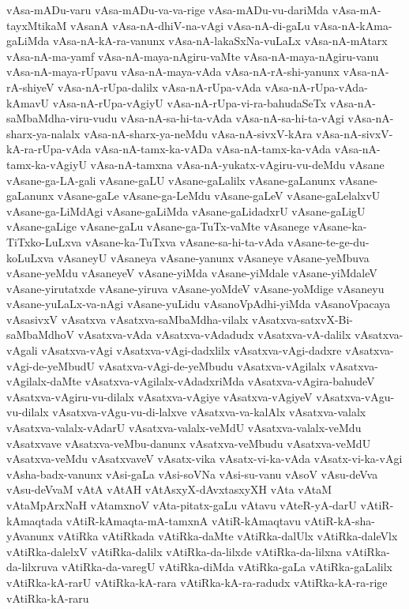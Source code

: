 {vAsa-mADu-varu
vAsa-mADu-va-va-rige
vAsa-mADu-vu-dariMda
vAsa-mA-tayxMtikaM
vAsanA
vAsa-nA-dhiV-na-vAgi
vAsa-nA-di-gaLu
vAsa-nA-kAma-gaLiMda
vAsa-nA-kA-ra-vanunx
vAsa-nA-lakaSxNa-vuLaLx
vAsa-nA-mAtarx
vAsa-nA-ma-yamf
vAsa-nA-maya-nAgiru-vaMte
vAsa-nA-maya-nAgiru-vanu
vAsa-nA-maya-rUpavu
vAsa-nA-maya-vAda
vAsa-nA-rA-shi-yanunx
vAsa-nA-rA-shiyeV
vAsa-nA-rUpa-dalilx
vAsa-nA-rUpa-vAda
vAsa-nA-rUpa-vAda-kAmavU
vAsa-nA-rUpa-vAgiyU
vAsa-nA-rUpa-vi-ra-bahudaSeTx
vAsa-nA-saMbaMdha-viru-vudu
vAsa-nA-sa-hi-ta-vAda
vAsa-nA-sa-hi-ta-vAgi
vAsa-nA-sharx-ya-nalalx
vAsa-nA-sharx-ya-neMdu
vAsa-nA-sivxV-kAra
vAsa-nA-sivxV-kA-ra-rUpa-vAda
vAsa-nA-tamx-ka-vADa
vAsa-nA-tamx-ka-vAda
vAsa-nA-tamx-ka-vAgiyU
vAsa-nA-tamxna
vAsa-nA-yukatx-vAgiru-vu-deMdu
vAsane
vAsane-ga-LA-gali
vAsane-gaLU
vAsane-gaLalilx
vAsane-gaLanunx
vAsane-gaLanunx
vAsane-gaLe
vAsane-ga-LeMdu
vAsane-gaLeV
vAsane-gaLelalxvU
vAsane-ga-LiMdAgi
vAsane-gaLiMda
vAsane-gaLidadxrU
vAsane-gaLigU
vAsane-gaLige
vAsane-gaLu
vAsane-ga-TuTx-vaMte
vAsanege
vAsane-ka-TiTxko-LuLxva
vAsane-ka-TuTxva
vAsane-sa-hi-ta-vAda
vAsane-te-ge-du-koLuLxva
vAsaneyU
vAsaneya
vAsane-yanunx
vAsaneye
vAsane-yeMbuva
vAsane-yeMdu
vAsaneyeV
vAsane-yiMda
vAsane-yiMdale
vAsane-yiMdaleV
vAsane-yirutatxde
vAsane-yiruva
vAsane-yoMdeV
vAsane-yoMdige
vAsaneyu
vAsane-yuLaLx-va-nAgi
vAsane-yuLidu
vAsanoVpAdhi-yiMda
vAsanoVpacaya
vAsasivxV
vAsatxva
vAsatxva-saMbaMdha-vilalx
vAsatxva-satxvX-Bi-saMbaMdhoV
vAsatxva-vAda
vAsatxva-vAdadudx
vAsatxva-vA-dalilx
vAsatxva-vAgali
vAsatxva-vAgi
vAsatxva-vAgi-dadxlilx
vAsatxva-vAgi-dadxre
vAsatxva-vAgi-de-yeMbudU
vAsatxva-vAgi-de-yeMbudu
vAsatxva-vAgilalx
vAsatxva-vAgilalx-daMte
vAsatxva-vAgilalx-vAdadxriMda
vAsatxva-vAgira-bahudeV
vAsatxva-vAgiru-vu-dilalx
vAsatxva-vAgiye
vAsatxva-vAgiyeV
vAsatxva-vAgu-vu-dilalx
vAsatxva-vAgu-vu-di-lalxve
vAsatxva-va-kalAlx
vAsatxva-valalx
vAsatxva-valalx-vAdarU
vAsatxva-valalx-veMdU
vAsatxva-valalx-veMdu
vAsatxvave
vAsatxva-veMbu-danunx
vAsatxva-veMbudu
vAsatxva-veMdU
vAsatxva-veMdu
vAsatxvaveV
vAsatx-vika
vAsatx-vi-ka-vAda
vAsatx-vi-ka-vAgi
vAsha-badx-vanunx
vAsi-gaLa
vAsi-soVNa
vAsi-su-vanu
vAsoV
vAsu-deVva
vAsu-deVvaM
vAtA
vAtAH
vAtAsxyX-dAvxtasxyXH
vAta
vAtaM
vAtaMpArxNaH
vAtamxnoV
vAta-pitatx-gaLu
vAtavu
vAteR-yA-darU
vAtiR-kAmaqtada
vAtiR-kAmaqta-mA-tamxnA
vAtiR-kAmaqtavu
vAtiR-kA-sha-yAvanunx
vAtiRka
vAtiRkada
vAtiRka-daMte
vAtiRka-dalUlx
vAtiRka-daleVlx
vAtiRka-dalelxV
vAtiRka-dalilx
vAtiRka-da-lilxde
vAtiRka-da-lilxna
vAtiRka-da-lilxruva
vAtiRka-da-varegU
vAtiRka-diMda
vAtiRka-gaLa
vAtiRka-gaLalilx
vAtiRka-kA-rarU
vAtiRka-kA-rara
vAtiRka-kA-ra-radudx
vAtiRka-kA-ra-rige
vAtiRka-kA-raru
}
